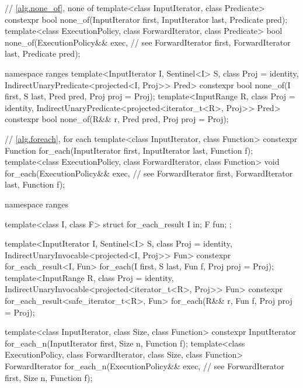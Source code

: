 \begin{codeblock}
  // \ref{alg.none_of}, none of
  template<class InputIterator, class Predicate>
    constexpr bool none_of(InputIterator first, InputIterator last, Predicate pred);
  template<class ExecutionPolicy, class ForwardIterator, class Predicate>
    bool none_of(ExecutionPolicy&& exec, // see 
                 ForwardIterator first, ForwardIterator last, Predicate pred);
\end{codeblock}\begin{addedblock}\begin{codeblock}
  namespace ranges {
    template<InputIterator I, Sentinel<I> S, class Proj = identity,
        IndirectUnaryPredicate<projected<I, Proj>> Pred>
      constexpr bool none_of(I first, S last, Pred pred, Proj proj = Proj{});
    template<InputRange R, class Proj = identity,
        IndirectUnaryPredicate<projected<iterator_t<R>, Proj>> Pred>
      constexpr bool none_of(R&& r, Pred pred, Proj proj = Proj{});
  }
\end{codeblock}\end{addedblock}\begin{codeblock}

  // \ref{alg.foreach}, for each
  template<class InputIterator, class Function>
    constexpr Function for_each(InputIterator first, InputIterator last, Function f);
  template<class ExecutionPolicy, class ForwardIterator, class Function>
    void for_each(ExecutionPolicy&& exec, // see 
                  ForwardIterator first, ForwardIterator last, Function f);
\end{codeblock}\begin{addedblock}\begin{codeblock}
  namespace ranges {
    template<class I, class F>
    struct for_each_result {
      I in;
      F fun;
    };

    template<InputIterator I, Sentinel<I> S, class Proj = identity,
        IndirectUnaryInvocable<projected<I, Proj>> Fun>
      constexpr for_each_result<I, Fun>
        for_each(I first, S last, Fun f, Proj proj = Proj{});
    template<InputRange R, class Proj = identity,
        IndirectUnaryInvocable<projected<iterator_t<R>, Proj>> Fun>
      constexpr for_each_result<safe_iterator_t<R>, Fun>
        for_each(R&& r, Fun f, Proj proj = Proj{});
  }
\end{codeblock}\end{addedblock}\begin{codeblock}
  template<class InputIterator, class Size, class Function>
    constexpr InputIterator for_each_n(InputIterator first, Size n, Function f);
  template<class ExecutionPolicy, class ForwardIterator, class Size, class Function>
    ForwardIterator for_each_n(ExecutionPolicy&& exec, // see 
                               ForwardIterator first, Size n, Function f);


\end{codeblock}
